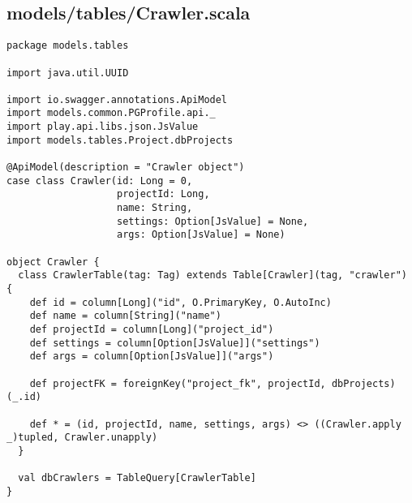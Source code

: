 \subsection{models/tables/Crawler.scala}
\begin{lstlisting}
package models.tables

import java.util.UUID

import io.swagger.annotations.ApiModel
import models.common.PGProfile.api._
import play.api.libs.json.JsValue
import models.tables.Project.dbProjects

@ApiModel(description = "Crawler object")
case class Crawler(id: Long = 0,
                   projectId: Long,
                   name: String,
                   settings: Option[JsValue] = None,
                   args: Option[JsValue] = None)

object Crawler {
  class CrawlerTable(tag: Tag) extends Table[Crawler](tag, "crawler") {
    def id = column[Long]("id", O.PrimaryKey, O.AutoInc)
    def name = column[String]("name")
    def projectId = column[Long]("project_id")
    def settings = column[Option[JsValue]]("settings")
    def args = column[Option[JsValue]]("args")

    def projectFK = foreignKey("project_fk", projectId, dbProjects)(_.id)

    def * = (id, projectId, name, settings, args) <> ((Crawler.apply _)tupled, Crawler.unapply)
  }

  val dbCrawlers = TableQuery[CrawlerTable]
}
\end{lstlisting}
